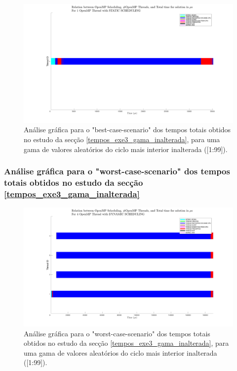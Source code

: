 \documentclass[a4paper]{article}
\begin{document}
\begin{figure}[H]
\centering
\includegraphics[width=0.9\columnwidth]{PNG/best_static_1_thread.png}
\caption{ Análise gráfica para o "best-case-scenario" dos tempos totais obtidos no estudo da secção \ref{tempos_exe3_gama_inalterada}, para uma gama de valores aleatórios do ciclo mais interior inalterada ([1:99]). }
\label{fig:best_static_1_thread}
\end{figure}


\subsubsection{Análise gráfica para o "worst-case-scenario" dos tempos totais obtidos no estudo da secção \ref{tempos_exe3_gama_inalterada}}



\begin{figure}[H]
\centering
\includegraphics[width=0.9\columnwidth]{PNG/worst_dynamic_4_threads.png}
\caption{ Análise gráfica para o "worst-case-scenario" dos tempos totais obtidos no estudo da secção \ref{tempos_exe3_gama_inalterada}, para uma gama de valores aleatórios do ciclo mais interior inalterada ([1:99]). }
\label{fig:worst_dynamic_4_threads}
\end{figure}
\end{document}
